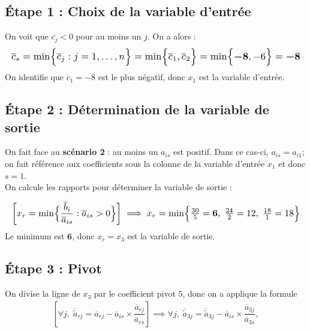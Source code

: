 \documentclass{report}
\begin{document}
\begin{multicols*}{2}
\subsection{Étape 1 : Choix de la variable d'entrée}
On voit que $\overline{c_j} < 0$ pour au moins un $j$. On a alors :
\begin{align*}
    \resizebox{1\linewidth}{!}{$ 
    \overline{c}_s = \min\Bigl\{\overline{c}_j : j = 1, \dots, n \Bigr\} 
    = \min\Bigl\{\overline{c}_1, \overline{c}_2 \Bigr\} 
    = \min\Bigl\{\boldsymbol{-8}, -6 \Bigr\}  = \boldsymbol{-8} 
$}
\end{align*}                
On identifie que $\overline{c}_1 = -8$ est le plus négatif, donc $x_1$ est la variable
d'entrée.

\subsection{Étape 2 : Détermination de la variable de sortie}
On fait face au \textbf{scénario 2}  : au moins un 
$a_{is}$ est positif. Dans ce cas-ci, $a_{is} = a_{i1}$; on fait 
référence aux coefficients sous la colonne de la variable d'entrée $x_1$ 
et donc $ s = 1$. 
\vspace{1em}\\
\indent On calcule les rapports pour déterminer la variable de sortie :

\begin{align*}
    \resizebox{1\linewidth}{!}{$ 
    \left[ x_r = \min \Bigl\{ \dfrac{\overline{b}_i}{\overline{a}_{is}} : \overline{a}_{is} > 0 \Bigr\} \right]
    \implies 
    x_r = \min \Bigl\{ \frac{30}{5} = \boldsymbol{6}, \; \frac{24}{2} = 12, \; \frac{18}{1} = 18   \Bigr\} 
$}
\end{align*}
Le minimum est $\boldsymbol{6}$, donc $x_r = x_3$ est la variable de sortie.

\subsection{Étape 3 : Pivot}

On divise la ligne de $x_3$ par le coefficient pivot $5$, donc on a applique la 
formule 
\begin{align*}
    \left[ \forall j, \;
        \overline{\tilde{a}}_{rj} = \overline{a}_{rj} -  
    \overline{a}_{is} \times \dfrac{\overline{a}_{rj}}{\overline{a}_{rs}} \right]  
    \implies 
    \forall j, \;
        \overline{\tilde{a}}_{3j} = \overline{\tilde{a}}_{3j} -  
        \overline{a}_{is} \times \dfrac{\overline{a}_{3j}}{\overline{a}_{3s}}, 
\end{align*}                


\end{multicols*}
\end{document}
